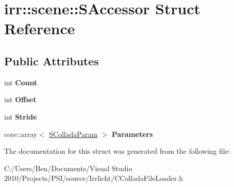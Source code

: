 \hypertarget{structirr_1_1scene_1_1_s_accessor}{\section{irr\-:\-:scene\-:\-:S\-Accessor Struct Reference}
\label{structirr_1_1scene_1_1_s_accessor}
}
\subsection*{Public Attributes}
\begin{DoxyCompactItemize}
\item 
\hypertarget{structirr_1_1scene_1_1_s_accessor_a0ec91da8df5d78a669ed2fcee72a7fd2}{int {\bfseries Count}}\label{structirr_1_1scene_1_1_s_accessor_a0ec91da8df5d78a669ed2fcee72a7fd2}

\item 
\hypertarget{structirr_1_1scene_1_1_s_accessor_a144df27127be9818a6038f56b4b260f7}{int {\bfseries Offset}}\label{structirr_1_1scene_1_1_s_accessor_a144df27127be9818a6038f56b4b260f7}

\item 
\hypertarget{structirr_1_1scene_1_1_s_accessor_a0c396a1af3ff4f92be1045dde2f08b18}{int {\bfseries Stride}}\label{structirr_1_1scene_1_1_s_accessor_a0c396a1af3ff4f92be1045dde2f08b18}

\item 
\hypertarget{structirr_1_1scene_1_1_s_accessor_aa9bbafbe6d12d0a65e4d457246fc2c78}{core\-::array$<$ \hyperlink{structirr_1_1scene_1_1_s_collada_param}{S\-Collada\-Param} $>$ {\bfseries Parameters}}\label{structirr_1_1scene_1_1_s_accessor_aa9bbafbe6d12d0a65e4d457246fc2c78}

\end{DoxyCompactItemize}


The documentation for this struct was generated from the following file\-:\begin{DoxyCompactItemize}
\item 
C\-:/\-Users/\-Ben/\-Documents/\-Visual Studio 2010/\-Projects/\-P\-S\-I/source/\-Irrlicht/C\-Collada\-File\-Loader.\-h\end{DoxyCompactItemize}
